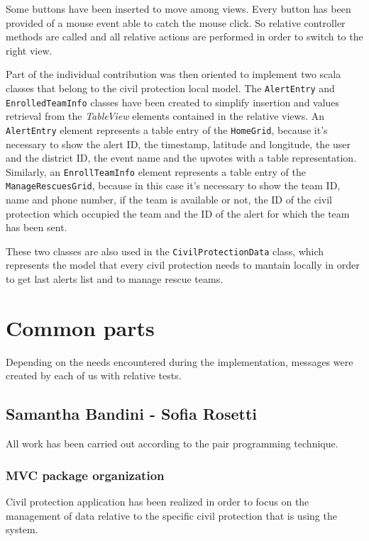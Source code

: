 \documentclass[a4paper,12pt]{report}
\begin{document}
Some buttons have been inserted to move among views. Every button has been provided of a mouse event able to catch the mouse click. So relative controller methods are called and all relative actions are performed in order to switch to the right view.

Part of the individual contribution was then oriented to implement two scala classes that belong to the civil protection local model.
The \texttt{AlertEntry} and \texttt{EnrolledTeamInfo} classes have been created to simplify insertion and values retrieval from the \textit{TableView} elements contained in the relative views. An \texttt{AlertEntry} element represents a table entry of the \texttt{HomeGrid}, because it's necessary to show the alert ID, the timestamp, latitude and longitude, the user and the district ID, the event name and the upvotes with a table representation. Similarly, an \texttt{EnrollTeamInfo} element represents a table entry of the \texttt{ManageRescuesGrid}, because in this case it's necessary to show the team ID, name and phone number, if the team is available or not, the ID of the civil protection which occupied the team and the ID of the alert for which the team has been sent.

These two classes are also used in the \texttt{CivilProtectionData} class, which represents the model that every civil protection needs to mantain locally in order to get last alerts list and to manage rescue teams.

\section{Common parts}
Depending on the needs encountered during the implementation, messages were created by each of us with relative tests.

\subsection{Samantha Bandini - Sofia Rosetti}
All work has been carried out according to the pair programming technique.

\subsubsection{MVC package organization}

Civil protection application has been realized in order to focus on the management of data relative to the specific civil protection that is using the system.\\
\end{document}
